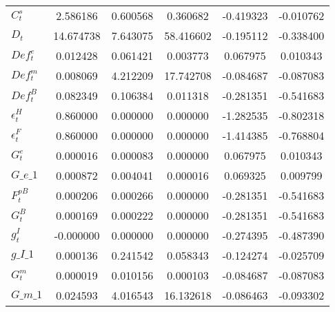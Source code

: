 \begin{center}
\begin{longtable}{lccccc}
$ C^s_t                     $	 & 	        2.586186	 & 	        0.600568	 & 	        0.360682	 & 	       -0.419323	 & 	       -0.010762 \\ 
$ D_t                       $	 & 	       14.674738	 & 	        7.643075	 & 	       58.416602	 & 	       -0.195112	 & 	       -0.338400 \\ 
$ Def^e_t                   $	 & 	        0.012428	 & 	        0.061421	 & 	        0.003773	 & 	        0.067975	 & 	        0.010343 \\ 
$ Def^m_t                   $	 & 	        0.008069	 & 	        4.212209	 & 	       17.742708	 & 	       -0.084687	 & 	       -0.087083 \\ 
$ Def^B_t                   $	 & 	        0.082349	 & 	        0.106384	 & 	        0.011318	 & 	       -0.281351	 & 	       -0.541683 \\ 
$ \epsilon^H_t              $	 & 	        0.860000	 & 	        0.000000	 & 	        0.000000	 & 	       -1.282535	 & 	       -0.802318 \\ 
$ \epsilon^F_t              $	 & 	        0.860000	 & 	        0.000000	 & 	        0.000000	 & 	       -1.414385	 & 	       -0.768804 \\ 
$ G^e_t                     $	 & 	        0.000016	 & 	        0.000083	 & 	        0.000000	 & 	        0.067975	 & 	        0.010343 \\ 
$G\_e\_1                    $	 & 	        0.000872	 & 	        0.004041	 & 	        0.000016	 & 	        0.069325	 & 	        0.009799 \\ 
$ F^{pB}_t                  $	 & 	        0.000206	 & 	        0.000266	 & 	        0.000000	 & 	       -0.281351	 & 	       -0.541683 \\ 
$ G^B_t                     $	 & 	        0.000169	 & 	        0.000222	 & 	        0.000000	 & 	       -0.281351	 & 	       -0.541683 \\ 
$ g^I_t                     $	 & 	       -0.000000	 & 	        0.000000	 & 	        0.000000	 & 	       -0.274395	 & 	       -0.487390 \\ 
$g\_I\_1                    $	 & 	        0.000136	 & 	        0.241542	 & 	        0.058343	 & 	       -0.124274	 & 	       -0.025709 \\ 
$ G^m_t                     $	 & 	        0.000019	 & 	        0.010156	 & 	        0.000103	 & 	       -0.084687	 & 	       -0.087083 \\ 
$G\_m\_1                    $	 & 	        0.024593	 & 	        4.016543	 & 	       16.132618	 & 	       -0.086463	 & 	       -0.093302 \\ 

\end{longtable}
\end{center}
